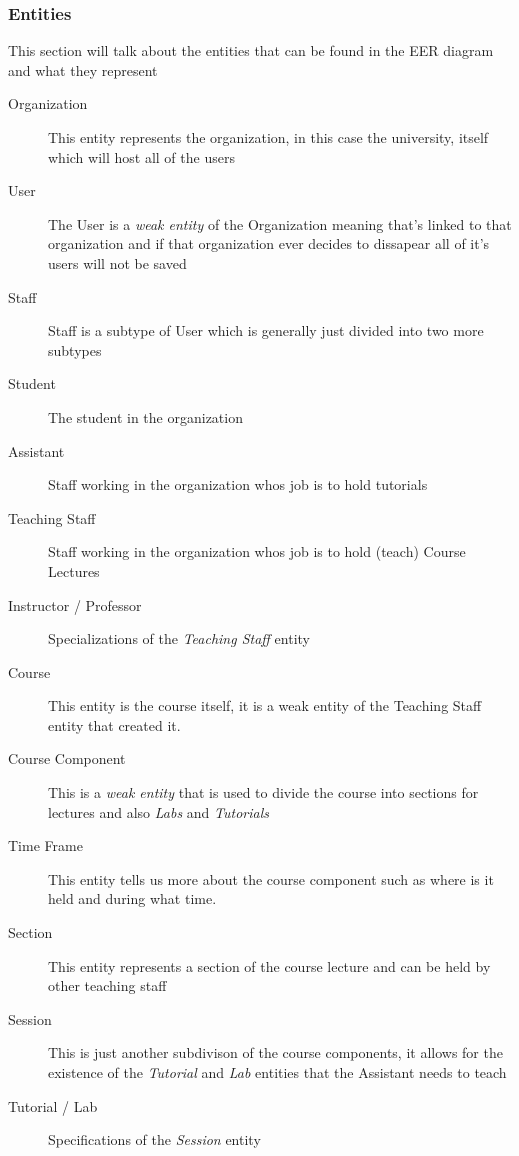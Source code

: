 \documentclass[a4paper, 12pt]{article}
\begin{document}
      \subsubsection{Entities}
        \noindent This section will talk about the entities that can be found in the EER diagram and what they represent
        \vspace{1mm}
        \begin{description}
          \item[Organization] This entity represents the organization, in this case the university, itself which will host all of the users
          \item[User] The User is a \emph{weak entity} of the Organization meaning that's linked to that organization and if that organization ever decides to dissapear all of it's users will not be saved 
          \item[Staff] Staff is a subtype of User which is generally just divided into two more subtypes
          \item[Student] The student in the organization
          \item[Assistant] Staff working in the organization whos job is to hold tutorials
          \item[Teaching Staff] Staff working in the organization whos job is to hold (teach) Course Lectures
          \item[Instructor / Professor] Specializations of the \emph{Teaching Staff} entity
          \item[Course] This entity is the course itself, it is a weak entity of the Teaching Staff entity that created it.
          \item[Course Component] This is a \emph{weak entity} that is used to divide the course into sections for lectures and also \emph{Labs} and \emph{Tutorials}
          \item[Time Frame] This entity tells us more about the course component such as where is it held and during what time.
          \item[Section] This entity represents a section of the course lecture and can be held by other teaching staff
          \item[Session] This is just another subdivison of the course components, it allows for the existence of the \emph{Tutorial} and \emph{Lab} entities that the Assistant needs to teach
          \item [Tutorial / Lab] Specifications of the \emph{Session} entity
        \end{description}
      
\end{document}
